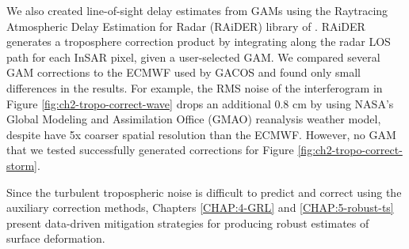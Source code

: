 We also created line-of-sight delay estimates from GAMs using the Raytracing Atmospheric Delay Estimation for Radar (RAiDER) library of \cite{Maurer2021RaiderRaytracingAtmospheric}. RAiDER generates a troposphere correction product by integrating along the radar LOS path for each InSAR pixel, given a user-selected GAM. We compared several GAM corrections to the ECMWF used by GACOS and found only small differences in the results. For example, the RMS noise of the interferogram in Figure \ref{fig:ch2-tropo-correct-wave} drops an additional 0.8 cm by using NASA's Global Modeling and Assimilation Office (GMAO) reanalysis weather model, despite have 5x coarser spatial resolution than the ECMWF. However, no GAM that we tested successfully generated corrections for Figure \ref{fig:ch2-tropo-correct-storm}.

 
Since the turbulent tropospheric noise is difficult to predict and correct using the auxiliary correction methods, Chapters \ref{CHAP:4-GRL} and \ref{CHAP:5-robust-ts} present data-driven mitigation strategies for producing robust estimates of surface deformation.










